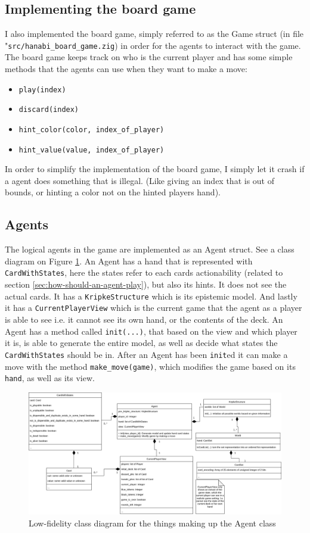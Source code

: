\subsection{Implementing the board game}
I also implemented the board game, simply referred to as the Game struct (in file "{\tt src/hanabi\_board\_game.zig}) in order for the agents to interact with the game. The board game keeps track on who is the current player and has some simple methods that the agents can use when they want to make a move:

\begin{itemize}
	\item {\tt play(index)}
	\item {\tt discard(index)}
	\item {\tt hint\_color(color, index\_of\_player) }
	\item {\tt hint\_value(value, index\_of\_player) }
\end{itemize}
In order to simplify the implementation of the board game, I simply let it crash if a agent does something that is illegal. (Like giving an index that is out of bounds, or hinting a color not on the hinted players hand).


\subsection{Agents}
The logical agents in the game are implemented as an Agent struct. See a class diagram on Figure \ref{fig:Agent-class-diagram}.
An Agent has a hand that is represented with {\tt CardWithStates}, here the states refer to each cards actionability (related to section \ref{sec:how-should-an-agent-play}), but also its hints. It does not see the actual cards. It has a {\tt KripkeStructure} which is its epistemic model. And lastly it has a {\tt CurrentPlayerView} which is the current game that the agent as a player is able to see i.e. it cannot see its own hand, or the contents of the deck. An Agent has a method called {\tt init(...)}, that based on the view and which player it is, is able to generate the entire model, as well as decide what states the {\tt CardWithStates} should be in. After an Agent has been {\tt init}ed it can make a move with the method {\tt make\_move(game)}, which modifies the game based on its {\tt hand}, as well as its view.

\begin{figure}
\includegraphics[width=22cm]{images/agent-uml-class-diagram.png}
	\caption{Low-fidelity class diagram for the things making up the Agent class}
	\label{fig:Agent-class-diagram}
\end{figure}

